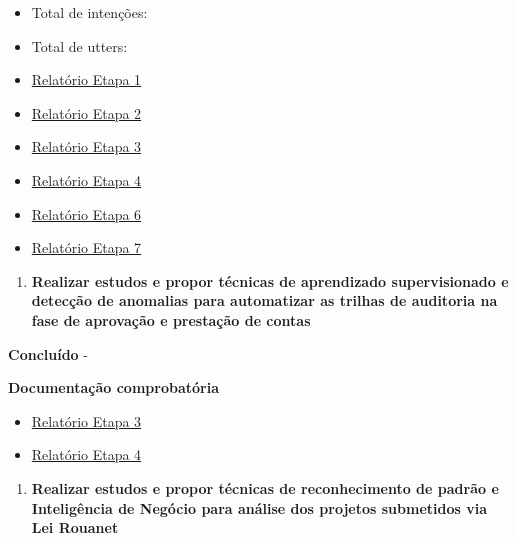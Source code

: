 \begin{itemize}
\item
  Total de intenções:
\item
  Total de utters:
\item
  \href{https://github.com/lappis-unb/EcossistemasSWLivre/blob/master/Relatorios/R1/RELATÓRIO\%20ETAPA\%201.pdf}{Relatório
  Etapa 1}
\item
  \href{https://github.com/lappis-unb/EcossistemasSWLivre/blob/master/Relatorios/R2/RELATÓRIO\%20ETAPA\%202.pdf}{Relatório
  Etapa 2}
\item
  \href{https://github.com/lappis-unb/EcossistemasSWLivre/blob/master/Relatorios/R3/RELATÓRIO\%20ETAPA\%203.md}{Relatório
  Etapa 3}
\item
  \href{https://github.com/lappis-unb/EcossistemasSWLivre/blob/master/Relatorios/R4/RELATÓRIO\%20ETAPA\%204.pdf}{Relatório
  Etapa 4}
\item
  \href{https://github.com/lappis-unb/EcossistemasSWLivre/blob/master/Relatorios/R6/RELATÓRIO\%20ETAPA\%206.pdf}{Relatório
  Etapa 6}
\item
  \href{https://github.com/lappis-unb/EcossistemasSWLivre/blob/master/Relatorios/R7/RELATÓRIO\%20ETAPA\%207.pdf}{Relatório
  Etapa 7}
\end{itemize}

\begin{enumerate}
\def\labelenumi{\arabic{enumi}.}
\setcounter{enumi}{1}
\tightlist
\item
  \textbf{Realizar estudos e propor técnicas de aprendizado
  supervisionado e detecção de anomalias para automatizar as trilhas de
  auditoria na fase de aprovação e prestação de contas}
\end{enumerate}

\textbf{Concluído} -

\textbf{Documentação comprobatória}

\begin{itemize}
\item
  \href{https://github.com/lappis-unb/EcossistemasSWLivre/blob/master/Relatorios/R3/RELATÓRIO\%20ETAPA\%203.md}{Relatório
  Etapa 3}
\item
  \href{https://github.com/lappis-unb/EcossistemasSWLivre/blob/master/Relatorios/R4/RELATÓRIO\%20ETAPA\%204.pdf}{Relatório
  Etapa 4}
\end{itemize}

\begin{enumerate}
\def\labelenumi{\arabic{enumi}.}
\setcounter{enumi}{2}
\tightlist
\item
  \textbf{Realizar estudos e propor técnicas de reconhecimento de padrão
  e Inteligência de Negócio para análise dos projetos submetidos via Lei
  Rouanet}
\end{enumerate}

